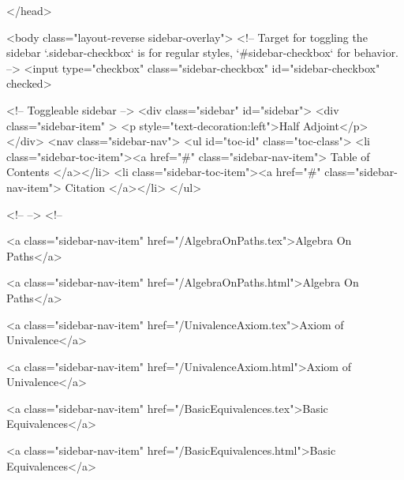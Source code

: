   
</head>




  <body class="layout-reverse sidebar-overlay">
    <!-- Target for toggling the sidebar `.sidebar-checkbox` is for regular
     styles, `#sidebar-checkbox` for behavior. -->
<input type="checkbox" class="sidebar-checkbox" id="sidebar-checkbox" checked>

<!-- Toggleable sidebar -->
<div class="sidebar" id="sidebar">
  <div class="sidebar-item" >
    <p style="text-decoration:left">Half Adjoint</p>
  </div>
  <nav class="sidebar-nav">
    <ul id="toc-id" class="toc-class">
  <li class="sidebar-toc-item"><a href="#" class="sidebar-nav-item"> Table of Contents </a></li>
  <li class="sidebar-toc-item"><a href="#" class="sidebar-nav-item"> Citation </a></li>
</ul>


    <!--  -->
    <!-- 
      
    
      
    
      
    
      
    
      
        
      
    
      
        
          <a class="sidebar-nav-item" href="/AlgebraOnPaths.tex">Algebra On Paths</a>
        
      
    
      
        
          <a class="sidebar-nav-item" href="/AlgebraOnPaths.html">Algebra On Paths</a>
        
      
    
      
        
          <a class="sidebar-nav-item" href="/UnivalenceAxiom.tex">Axiom of Univalence</a>
        
      
    
      
        
          <a class="sidebar-nav-item" href="/UnivalenceAxiom.html">Axiom of Univalence</a>
        
      
    
      
        
          <a class="sidebar-nav-item" href="/BasicEquivalences.tex">Basic Equivalences</a>
        
      
    
      
        
          <a class="sidebar-nav-item" href="/BasicEquivalences.html">Basic Equivalences</a>
        
